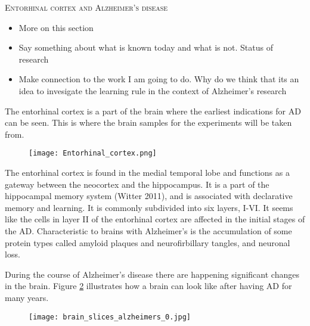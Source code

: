 \textsc{Entorhinal cortex and Alzheimer's disease}

\begin{itemize}
    \item More on this section
    \item Say something about what is known today and what is not. Status of research
    \item Make connection to the work I am going to do. Why do we think that its an idea to invesigate the learning rule in the context of Alzheimer's research
\end{itemize}

The entorhinal cortex is a part of the brain where the earliest indications for AD can be seen. This is where the brain samples for the experiments will be taken from.   


\begin{figure}[h]
    \centering
    \texttt{[image: Entorhinal\_cortex.png]}
    \label{brain}
\end{figure} 

The entorhinal cortex is found in the medial temporal lobe and functions as a gateway between the neocortex and the hippocampus. It is a part of the hippocampal memory system (Witter 2011), and is associated with declarative memory and learning. It is commonly subdivided into six layers, I-VI. It seems like the cells in layer II of the entorhinal cortex are affected in the initial stages of the AD. Characteristic to brains with Alzheimer's is the accumulation of some protein types called amyloid plaques and neurofirbillary tangles, and neuronal loss. 

During the course of Alzheimer's disease there are happening significant changes in the brain. Figure \ref{brain1} illustrates how a brain can look like after having AD for many years.


\begin{figure}[h]
    \label{brain1}
    \centering
    \texttt{[image: brain\_slices\_alzheimers\_0.jpg]}

\end{figure} 



